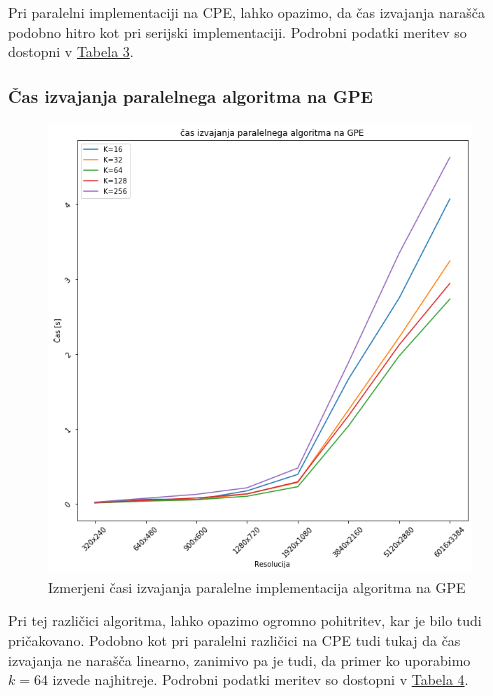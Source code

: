 \documentclass[11pt]{article}
\begin{document}
Pri paralelni implementaciji na CPE, lahko opazimo,
da čas izvajanja narašča podobno hitro kot pri serijski implementaciji.
Podrobni podatki meritev so dostopni v \hyperref[dat:cpup]{Tabela 3}.


\subsubsection{Čas izvajanja paralelnega algoritma na GPE}
\begin{figure}[H]
    \label{img:gpu}
    \centering
    \includegraphics[scale=0.5]{gpu}
    \caption{Izmerjeni časi izvajanja paralelne implementacija algoritma na GPE}
\end{figure}

Pri tej različici algoritma, lahko opazimo ogromno pohitritev, kar je bilo tudi pričakovano.
Podobno kot pri paralelni različici na CPE tudi tukaj da čas izvajanja ne narašča linearno, zanimivo pa je tudi, da primer ko uporabimo $k=64$ izvede najhitreje.
Podrobni podatki meritev so dostopni v \hyperref[dat:gpu]{Tabela 4}.
\end{document}

